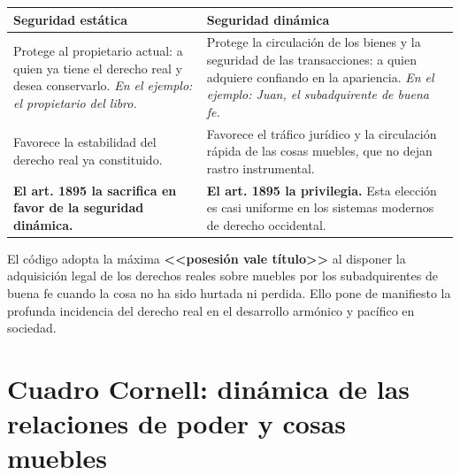 \documentclass[12pt,oneside]{book}
\begin{document}
\begin{center}
\begin{tabularx}{\textwidth}{
    >{\raggedright\arraybackslash}X
    >{\raggedright\arraybackslash}X
}
\toprule
\textbf{Seguridad estática} & \textbf{Seguridad dinámica} \\
\midrule
Protege al propietario actual: a quien ya tiene el derecho real y desea conservarlo. \textit{En el ejemplo: el propietario del libro.} &
Protege la circulación de los bienes y la seguridad de las transacciones: a quien adquiere confiando en la apariencia. \textit{En el ejemplo: Juan, el subadquirente de buena fe.} \\
\midrule
Favorece la estabilidad del derecho real ya constituido. &
Favorece el tráfico jurídico y la circulación rápida de las cosas muebles, que no dejan rastro instrumental. \\
\midrule
\textbf{El art. 1895 la sacrifica en favor de la seguridad dinámica.} &
\textbf{El art. 1895 la privilegia.} Esta elección es casi uniforme en los sistemas modernos de derecho occidental. \\
\bottomrule
\end{tabularx}
\end{center}

El código adopta la máxima \textbf{<<posesión vale título>>} al disponer la adquisición legal de los derechos reales sobre muebles por los subadquirentes de buena fe cuando la cosa no ha sido hurtada ni perdida. Ello pone de manifiesto la profunda incidencia del derecho real en el desarrollo armónico y pacífico en sociedad.

\section{Cuadro Cornell: dinámica de las relaciones de poder y cosas muebles}
\end{document}
